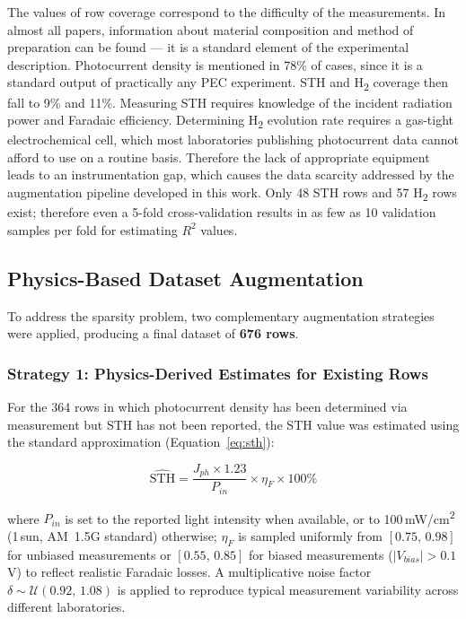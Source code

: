 The values of row coverage correspond to the difficulty of the measurements.
In almost all papers, information about material composition and method of
preparation can be found --- it is a standard element of the experimental
description.
Photocurrent density is mentioned in 78\% of cases, since it is a standard output
of practically any PEC experiment.
STH and H\textsubscript{2} coverage then fall to 9\% and 11\%.
Measuring STH requires knowledge of the incident radiation power and Faradaic
efficiency.
Determining H\textsubscript{2} evolution rate requires a gas-tight electrochemical
cell, which most laboratories publishing photocurrent data cannot afford to use on
a routine basis.
Therefore the lack of appropriate equipment leads to an instrumentation gap, which
causes the data scarcity addressed by the augmentation pipeline developed in this
work.
Only 48 STH rows and 57 H\textsubscript{2} rows exist; therefore even a 5-fold
cross-validation results in as few as 10 validation samples per fold for estimating
$R^2$ values.

\subsection{Physics-Based Dataset Augmentation}

To address the sparsity problem, two complementary augmentation strategies were
applied, producing a final dataset of \textbf{676 rows}.

\subsubsection{Strategy 1: Physics-Derived Estimates for Existing Rows}

For the 364 rows in which photocurrent density has been determined via measurement
but STH has not been reported, the STH value was estimated using the standard
approximation (Equation~\eqref{eq:sth}):

\begin{equation}
  \widehat{\mathrm{STH}} =
    \frac{J_{ph} \times 1.23}{P_{in}} \times \eta_F \times 100\%
  \label{eq:sth_est}
\end{equation}

where $P_{in}$ is set to the reported light intensity when available, or to
100\,mW/cm\textsuperscript{2} (1\,sun, AM~1.5G standard) otherwise;
$\eta_F$ is sampled uniformly from $[0.75,\,0.98]$ for unbiased measurements
or $[0.55,\,0.85]$ for biased measurements ($|V_{bias}| > 0.1$\,V) to reflect
realistic Faradaic losses.
A multiplicative noise factor $\delta \sim \mathcal{U}(0.92,\,1.08)$ is applied
to reproduce typical measurement variability across different laboratories.

